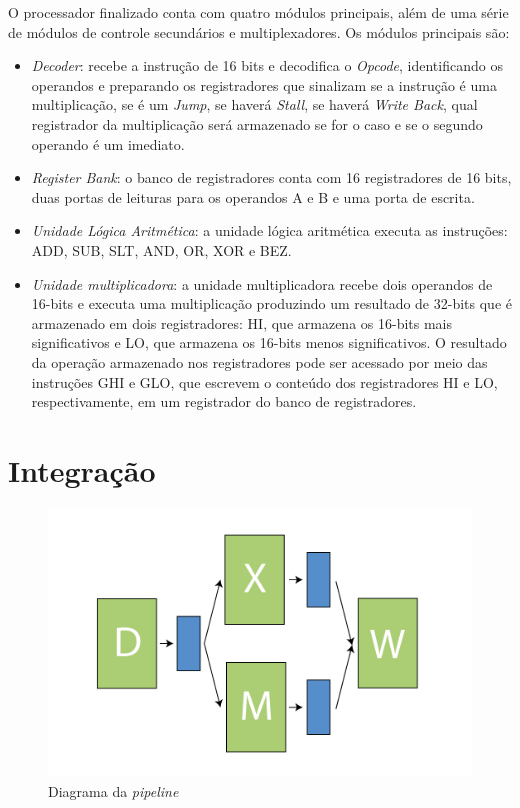 \documentclass[11pt,a4paper,titlepage]{article}
\begin{document}
O processador finalizado conta com quatro módulos principais, além de uma série de módulos
de controle secundários e multiplexadores. Os módulos principais são:

\begin{itemize}

\item \textit{Decoder}: recebe a instrução de 16 bits e decodifica o \textit{Opcode},
identificando os operandos e preparando os registradores que sinalizam se a instrução é uma 
multiplicação, se é um \textit{Jump}, se haverá \textit{Stall}, se haverá \textit{Write Back},
qual registrador da multiplicação será armazenado se for o caso e se o segundo operando é
um imediato.

\item \textit{Register Bank}: o banco de registradores conta com 16 registradores de 16 bits,
duas portas de leituras para os operandos A e B e uma porta de escrita.

\item \textit{Unidade Lógica Aritmética}: a unidade lógica aritmética executa as instruções: 
ADD, SUB, SLT, AND, OR, XOR e BEZ.

\item \textit{Unidade multiplicadora}: a unidade multiplicadora recebe dois operandos de 16-bits
e executa uma multiplicação produzindo um resultado de 32-bits que é armazenado em dois registradores:
HI, que armazena os 16-bits mais significativos e LO, que armazena os 16-bits menos significativos.
O resultado da operação armazenado nos registradores pode ser acessado por meio das instruções 
GHI e GLO, que escrevem o conteúdo dos registradores HI e LO, respectivamente, em um registrador
do banco de registradores.

\end{itemize}



\section{Integração}

\begin{figure}[!h]
\centering
\includegraphics[scale=0.5]{images/pipeline_diagram.png}
\caption{Diagrama da \textit{pipeline}}
\label{fig:pipeline_diagram}
\end{figure}
\end{document}
